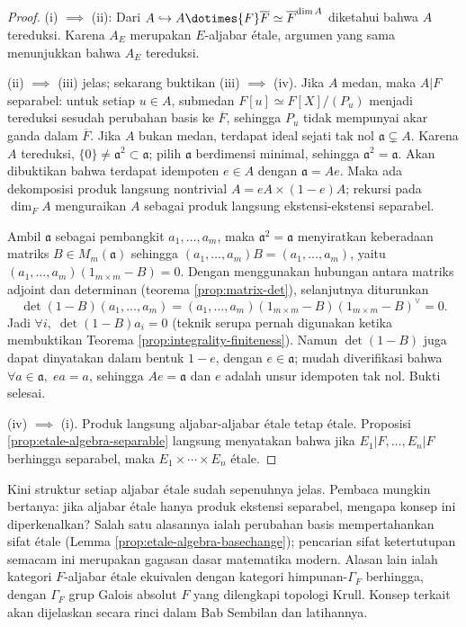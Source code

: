 \begin{proof}
	(i) $\implies$ (ii): Dari $A \hookrightarrow A \dotimes{F} \overline{F} \simeq \overline{F}^{\dim A}$ diketahui bahwa $A$ tereduksi. Karena $A_E$ merupakan $E$-aljabar étale, argumen yang sama menunjukkan bahwa $A_E$ tereduksi.

	(ii) $\implies$ (iii) jelas; sekarang buktikan (iii) $\implies$ (iv). Jika $A$ medan, maka $A|F$ separabel: untuk setiap $u \in A$, submedan $F[u] \simeq F[X]/(P_u)$ menjadi tereduksi sesudah perubahan basis ke $\overline{F}$, sehingga $P_u$ tidak mempunyai akar ganda dalam $\overline{F}$. Jika $A$ bukan medan, terdapat ideal sejati tak nol $\mathfrak{a} \subsetneq A$. Karena $A$ tereduksi, $\{0\} \neq \mathfrak{a}^2 \subset \mathfrak{a}$; pilih $\mathfrak{a}$ berdimensi minimal, sehingga $\mathfrak{a}^2 = \mathfrak{a}$. Akan dibuktikan bahwa terdapat idempoten $e \in A$ dengan $\mathfrak{a} = Ae$. Maka ada dekomposisi produk langsung nontrivial $A = eA \times (1-e)A$; rekursi pada $\dim_F A$ menguraikan $A$ sebagai produk langsung ekstensi-ekstensi separabel.

	Ambil $\mathfrak{a}$ sebagai pembangkit $a_1, \ldots, a_m$, maka $\mathfrak{a}^2 = \mathfrak{a}$ menyiratkan keberadaan matriks $B \in M_m(\mathfrak{a})$ sehingga $(a_1, \ldots, a_m) B = (a_1, \ldots, a_m)$, yaitu $(a_1, \ldots, a_m) \left( 1_{m \times m} - B \right) = 0$. Dengan menggunakan hubungan antara matriks adjoint dan determinan (teorema \ref{prop:matrix-det}), selanjutnya diturunkan
	\[ \det(1-B) (a_1, \ldots, a_m) = (a_1, \ldots, a_m) \left( 1_{m \times m} - B \right) \left( 1_{m \times m} - B \right)^\vee = 0. \]
	Jadi $\forall i,\; \det(1-B)a_i = 0$ (teknik serupa pernah digunakan ketika membuktikan Teorema \ref{prop:integrality-finiteness}). Namun $\det(1-B)$ juga dapat dinyatakan dalam bentuk $1-e$, dengan $e \in \mathfrak{a}$; mudah diverifikasi bahwa $\forall a \in \mathfrak{a},\; ea = a$, sehingga $Ae = \mathfrak{a}$ dan $e$ adalah unsur idempoten tak nol. Bukti selesai.
	
	(iv) $\implies$ (i). Produk langsung aljabar-aljabar étale tetap étale. Proposisi \ref{prop:etale-algebra-separable} langsung menyatakan bahwa jika $E_1|F, \ldots, E_n|F$ berhingga separabel, maka $E_1 \times \cdots \times E_n$ étale.
\end{proof}

Kini struktur setiap aljabar étale sudah sepenuhnya jelas. Pembaca mungkin bertanya: jika aljabar étale hanya produk ekstensi separabel, mengapa konsep ini diperkenalkan? Salah satu alasannya ialah perubahan basis mempertahankan sifat étale (Lemma \ref{prop:etale-algebra-basechange}); pencarian sifat ketertutupan semacam ini merupakan gagasan dasar matematika modern. Alasan lain ialah kategori $F$-aljabar étale ekuivalen dengan kategori himpunan-$\Gamma_F$ berhingga, dengan $\Gamma_F$ grup Galois absolut $F$ yang dilengkapi topologi Krull. Konsep terkait akan dijelaskan secara rinci dalam Bab Sembilan dan latihannya.

